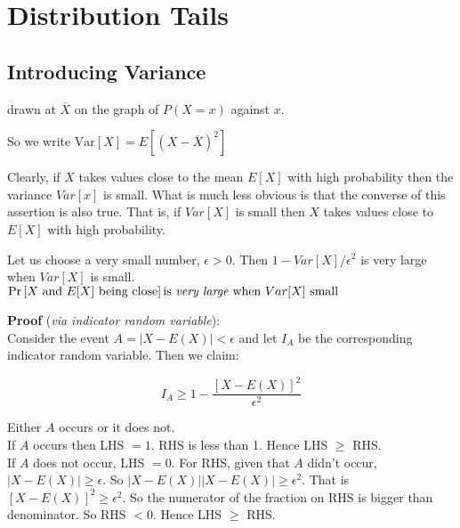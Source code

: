 
\chapter{Distribution Tails}



\section{Introducing Variance}





drawn at $\overline{X}$ on the graph of $P(X=x)$ against $x$. 


So we write $\text{Var}[X] = E[(X - \overline{X})^2]$






\frmrule

Clearly, if $X$ takes values close to the mean $E[X]$ with high probability 
then the variance $Var[x]$ is small. What is much less obvious is that 
the converse of this assertion is also true. That is, if $Var[X]$ is small 
then $X$ takes values close to $E[X]$ with high probability. 

Let us choose a very small number, $\epsilon > 0$. Then $1 - Var[X]/\epsilon^2$ is 
very large when $Var[X]$ is small. 
$\text{Pr}\left[X \text{ and } E[X] \text{ being close}\right] \text{is } \textit{very large } \text{when } Var[X] \text{ small}$



\frmrule

\textbf{Proof} (\textit{via indicator random variable}): \\
Consider the event $A = {|X - E(X)| < \epsilon}$ and let $I_A$ be the corresponding 
indicator random variable. Then we claim:

$$I_A \geqslant 1 - \frac{[X - E(X)]^2}{\epsilon^2}$$

Either $A$ occurs or it does not. \\
If $A$ occurs then LHS $= 1$. RHS is less than 1. Hence LHS $\geqslant$ RHS. \\
If $A$ does not occur, LHS $= 0$. 
For RHS, given that $A$ didn't occur, $|X - E(X)| \geqslant \epsilon$. 
So $|X - E(X)||X - E(X)| \geqslant \epsilon^2$. That is $[X - E(X)]^2 \geqslant \epsilon^2$. 
So the numerator of the fraction on RHS is bigger than denominator. So RHS $< 0$. Hence LHS $\geqslant$ RHS.

